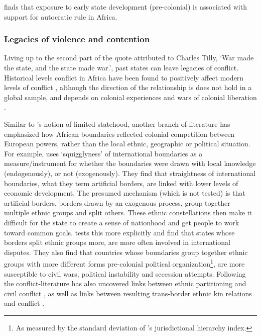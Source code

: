 \documentclass[12pt]{article}
\begin{document}
\citep{Chlouba_2021} finds that exposure to early state development
(pre-colonial) is associated with support for autocratic rule in Africa.

\subsubsection{Legacies of violence and contention} 
\label{Legacies of violence and contention}

Living up to the second part of the quote attributed to Charles Tilly, `War
made the state, and the state made war.', past states can leave legacies of
conflict. Historical levels conflict in Africa have been found to positively
affect modern levels of conflict \citep{Besley2014}, although the direction of
the relationship is does not hold in a global sample, and depends on colonial
experiences and wars of colonial liberation \citep{Fearon2014}. 


Similar to \citet{Clapham1996}'s notion of limited statehood, another branch of
literature has emphasized how African boundaries reflected colonial competition
between European powers, rather than the local ethnic, geographic or political
situation. For example, \citet{Alesina2011} uses `squigglyness' of international
boundaries as a measure/instrument for whether the boundaries were drawn with
local knowledge (endogenously), or not (exogenously). They find that
straightness of international boundaries, what they term artificial borders, are
linked with lower levels of economic development. The presumed mechanism (which
is not tested) is that artificial borders, borders drawn by an exogenous
process, group together multiple ethnic groups and split others. These ethnic
constellations then make it difficult for the state to create a sense of
nationhood and get people to work toward common goals. \citet{Englebert2002}
tests this more explicitly and find that states whose borders split ethnic
groups more, are more often involved in international disputes. They also find
that countries whose boundaries group together ethnic groups with more different
forms pre-colonial political organization\footnote{As measured by the standard
deviation of \citet{Murdock1967}'s jurisdictional hierarchy index.}, are more
susceptible to civil wars, political instability and secession attempts.
Following \citet{Englebert2002} the conflict-literature has also uncovered links
between ethnic partitioning and civil conflict \citep{Ito2020,
Michalopoulos2016}, as well as links between resulting trans-border ethnic kin
relations and conflict \citep{Cederman2013, Salehyan2009, Weidmann2015}. 
\end{document}
